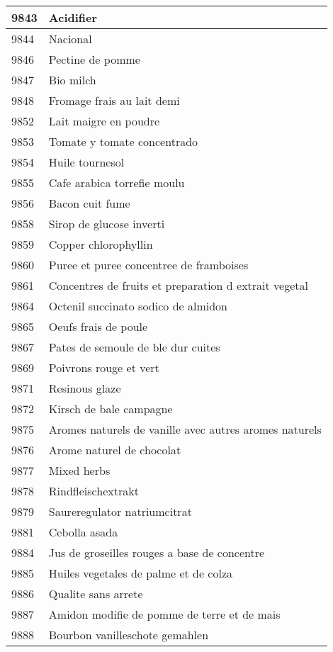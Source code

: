 \begin{longtable}{|l|l|}
9843 & Acidifier \\ \hline 
9844 & Nacional \\ \hline 
9846 & Pectine de pomme \\ \hline 
9847 & Bio milch \\ \hline 
9848 & Fromage frais au lait demi \\ \hline 
9852 & Lait maigre en poudre \\ \hline 
9853 & Tomate y tomate concentrado \\ \hline 
9854 & Huile tournesol \\ \hline 
9855 & Cafe arabica torrefie moulu \\ \hline 
9856 & Bacon cuit fume \\ \hline 
9858 & Sirop de glucose inverti \\ \hline 
9859 & Copper chlorophyllin \\ \hline 
9860 & Puree et puree concentree de framboises \\ \hline 
9861 & Concentres de fruits et preparation d extrait vegetal \\ \hline 
9864 & Octenil succinato sodico de almidon \\ \hline 
9865 & Oeufs frais de poule \\ \hline 
9867 & Pates de semoule de ble dur cuites \\ \hline 
9869 & Poivrons rouge et vert \\ \hline 
9871 & Resinous glaze \\ \hline 
9872 & Kirsch de bale campagne \\ \hline 
9875 & Aromes naturels de vanille avec autres aromes naturels \\ \hline 
9876 & Arome naturel de chocolat \\ \hline 
9877 & Mixed herbs \\ \hline 
9878 & Rindfleischextrakt \\ \hline 
9879 & Saureregulator natriumcitrat \\ \hline 
9881 & Cebolla asada \\ \hline 
9884 & Jus de groseilles rouges a base de concentre \\ \hline 
9885 & Huiles vegetales de palme et de colza \\ \hline 
9886 & Qualite sans arrete \\ \hline 
9887 & Amidon modifie de pomme de terre et de mais \\ \hline 
9888 & Bourbon vanilleschote gemahlen \\ \hline 

\end{longtable}
